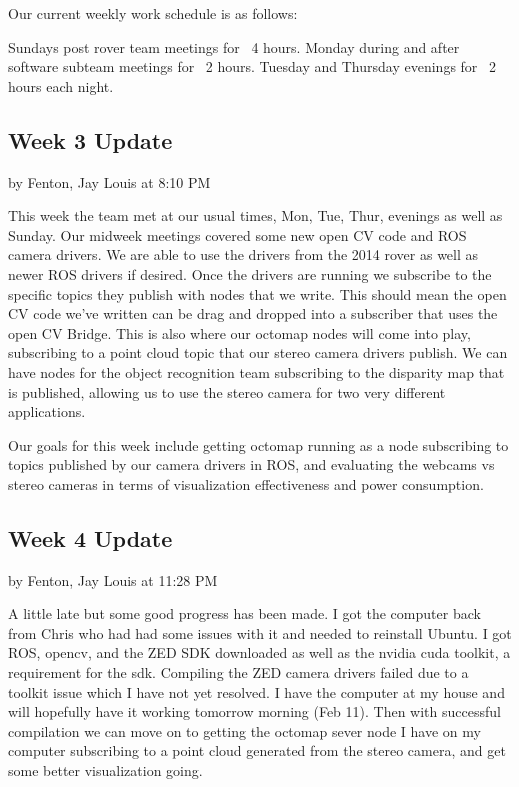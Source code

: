 \documentclass[10pt, oneside,onecolumn]{IEEEtran}
\begin{document}
Our current weekly work schedule is as follows:

Sundays post rover team meetings for ~4 hours.
Monday during and after software subteam meetings for ~2 hours.
Tuesday and Thursday evenings for ~2 hours each night. 

\subsection{Week 3 Update}
by Fenton, Jay Louis at 8:10 PM

This week the team met at our usual times, Mon, Tue, Thur, evenings as well as Sunday. Our midweek meetings covered some new open CV code and ROS camera drivers. We are able to use the drivers from the 2014 rover as well as newer ROS drivers if desired. Once the drivers are running we subscribe to the specific topics they publish with nodes that we write. This should mean the open CV code we've written can be drag and dropped into a subscriber that uses the open CV Bridge. This is also where our octomap nodes will come into play, subscribing to a point cloud topic that our stereo camera drivers publish. We can have nodes for the object recognition team subscribing to the disparity map that is published, allowing us to use the stereo camera for two very different applications. 

Our goals for this week include getting octomap running as a node subscribing to topics published by our camera drivers in ROS, and evaluating the webcams vs stereo cameras in terms of visualization effectiveness and power consumption.

\subsection{Week 4 Update}
by Fenton, Jay Louis at 11:28 PM 

A little late but some good progress has been made. I got the computer back from Chris who had had some issues with it and needed to reinstall Ubuntu. I got ROS, opencv, and the ZED SDK downloaded as well as the nvidia cuda toolkit, a requirement for the sdk. Compiling the ZED camera drivers failed due to a toolkit issue which I have not yet resolved. I have the computer at my house and will hopefully have it working tomorrow morning (Feb 11). Then with successful compilation we can move on to getting the octomap sever node I have on my computer subscribing to a point cloud generated from the stereo camera, and get some better visualization going. 
\end{document}
